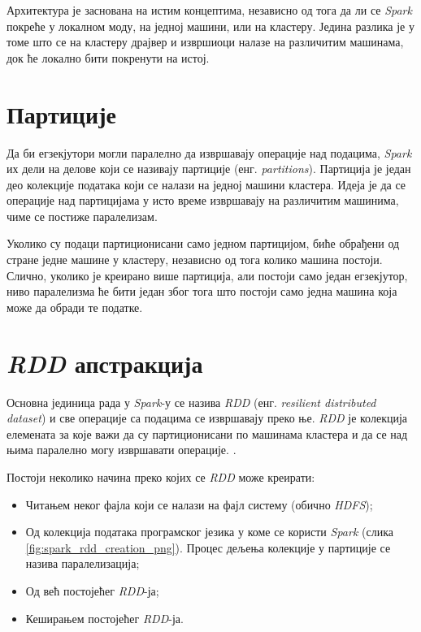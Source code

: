 \documentclass[12pt,oneside]{memoir}
\begin{document}
Архитектура је заснована на истим концептима, независно од тога да ли се \textit{Spark} покреће у локалном моду, на једној машини, или на кластеру. Једина разлика је у томе што се на кластеру драјвер и извршиоци налазе на различитим машинама, док ће локално бити покренути на истој.

\section{Партиције}
\label{sec:spark_partic}

Да би егзекјутори могли паралелно да извршавају операције над подацима, \textit{Spark} их дели на делове који се називају партиције (енг. \textit{partitions}). Партиција је један део колекције података који се налази на једној машини кластера. Идеја је да се операције над партицијама у исто време извршавају на различитим машинима, чиме се постиже паралелизам. \cite{spark_guide}


Уколико су подаци партиционисани само једном партицијом, биће обрађени од стране једне машине у кластеру, независно од тога колико машина постоји. Слично, уколико је креирано више партиција, али постоји само један егзекјутор, ниво паралелизма ће бити један због тога што постоји само једна машина која може да обради те податке. \cite{spark_guide}

\section{\textit{RDD} апстракција}
\label{sec:spark_rdd}

Основна јединица рада у \textit{Spark}-у се назива \textit{RDD} (енг. \textit{resilient distributed dataset}) и све операције са подацима се извршавају преко ње. \textit{RDD} је колекција елемената за које важи да су партиционисани по машинама кластера и да се над њима паралелно могу извршавати операције. \cite{spark_rdd}.

Постоји неколико начина преко којих се \textit{RDD} може креирати:
\begin{itemize}
\item Читањем неког фајла који се налази на фајл систему (обично \textit{HDFS});
\item Од колекција података програмског језика у коме се користи \textit{Spark} (слика \ref{fig:spark_rdd_creation_png}). Процес дељења колекције у партиције се назива паралелизација;
\item Од већ постојећег \textit{RDD}-ја;
\item Кеширањем постојећег \textit{RDD}-ја.
\end{itemize}
\end{document}
